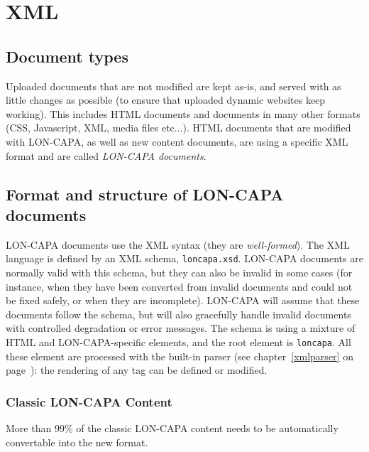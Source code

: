 \chapter{XML}

\section{Document types}
Uploaded documents that are not modified are kept as-is, and served with as little changes as possible (to ensure that uploaded dynamic websites keep working). This includes HTML documents and documents in many other formats (CSS, Javascript, XML, media files etc...).
HTML documents that are modified with LON-CAPA, as well as new content documents, are using a specific XML format and are called \emph{LON-CAPA documents}.

\section{Format and structure of LON-CAPA documents}
LON-CAPA documents use the XML syntax (they are \emph{well-formed}). The XML language is defined by an XML schema, \texttt{loncapa.xsd}. LON-CAPA documents are normally valid with this schema, but they can also be invalid in some cases (for instance, when they have been converted from invalid documents and could not be fixed safely, or when they are incomplete).
LON-CAPA will assume that these documents follow the schema, but will also gracefully handle invalid documents with controlled degradation or error messages.
The schema is using a mixture of HTML and LON-CAPA-specific elements, and the root element is \texttt{loncapa}. All these element are processed with the built-in parser (see chapter~\ref{xmlparser} on page~\pageref{xmlparser}): the rendering of any tag can be defined or modified.
\subsection{Classic LON-CAPA Content}
More than 99\% of the classic LON-CAPA content needs to be automatically convertable into the new format.
